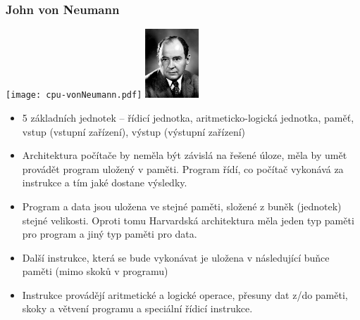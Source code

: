 \documentclass{beamer}
\begin{document}
\begin{frame}[shrink=10]
\frametitle{John von Neumann}
\begin{center}
\texttt{[image: cpu-vonNeumann.pdf]}
\phantom{XXXXXXX}
\includegraphics[width=0.15\textwidth]{fig/vonNeumann.png}
\end{center}
\begin{itemize}
\item 5 základních jednotek – řídicí jednotka, aritmeticko-logická jednotka, paměť, vstup (vstupní zařízení), výstup (výstupní zařízení)
\item Architektura počítače by neměla být závislá na řešené úloze, měla by umět provádět program uložený v paměti. Program řídí, co počítač vykonává za instrukce a tím jaké dostane výsledky.
\item Program a data jsou uložena ve stejné paměti, složené z buněk (jednotek) stejné velikosti. Oproti tomu Harvardská architektura měla jeden typ paměti pro program a jiný typ paměti pro data.
\item Další instrukce, která se bude vykonávat je uložena v následující buňce paměti (mimo skoků v programu)
\item Instrukce provádějí aritmetické a logické operace, přesuny dat z/do paměti, skoky a větvení programu a speciální řídicí instrukce.
\end{itemize}
\end{frame}
\end{document}

